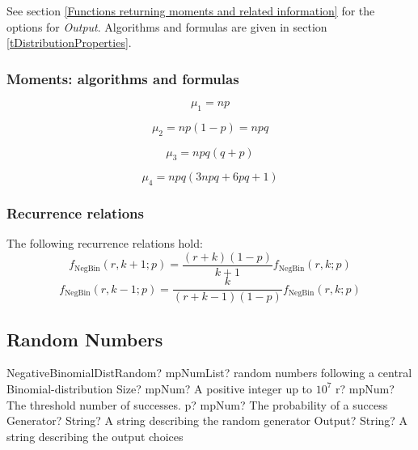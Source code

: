 \vspace{0.3cm}

See section \ref{Functions returning moments and related information} for the options for {\itshape\sffamily Output}. Algorithms and formulas are given in section \ref{tDistributionProperties}.



\subsubsection{Moments: algorithms and formulas}

\begin{equation} 
	\mu_1 = np
\end{equation}

\begin{equation} 
	\mu_2 = np(1-p) = npq
\end{equation}

\begin{equation} 
	\mu_3 = npq(q+p)
\end{equation}

\begin{equation} 
	\mu_4 = npq(3npq+6pq+1)
\end{equation}



\subsubsection{Recurrence relations}
The following recurrence relations hold:
\begin{equation} 
	f_{\text{NegBin}}(r, k+1; p) = \frac{(r+k)(1-p)}{k+1} f_{\text{NegBin}}(r, k; p)
\end{equation}
\begin{equation} 
	f_{\text{NegBin}}(r, k-1; p) = \frac{k}{(r+k-1)(1-p)} f_{\text{NegBin}}(r, k; p)
\end{equation}



\subsection{Random Numbers}

\begin{mpFunctionsExtract}
	\mpFunctionFiveNotImplemented
	{NegativeBinomialDistRandom? mpNumList? random numbers following a central Binomial-distribution}
	{Size? mpNum? A positive integer up to $10^7$}
	{r? mpNum? The threshold number of successes.}
	{p? mpNum? The probability of a success}
	{Generator? String? A string describing the random generator}
	{Output? String? A string describing the output choices}
\end{mpFunctionsExtract}

